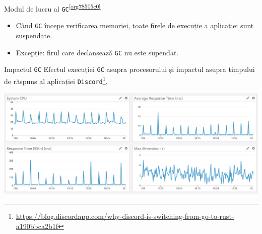 \documentclass[presentation]{beamer}
\begin{document}
\begin{frame}[label={sec:org04d3af9},fragile]{Modul de lucru al \texttt{GC}\textsuperscript{\ref{org78505c0}}}
 \begin{itemize}
\item Când \texttt{GC} începe verificarea memoriei, toate firele de execuție a aplicației sunt suspendate.
\item Excepție: firul care declanșează \texttt{GC} nu este supendat.
\end{itemize}
\end{frame}
\begin{frame}[label={sec:org41baded},fragile]{Impactul \texttt{GC}}
 Efectul execuției \texttt{GC} asupra procesorului și impactul asupra timpului de răspuns al aplicației \texttt{Discord}\footnote{\url{https://blog.discordapp.com/why-discord-is-switching-from-go-to-rust-a190bbca2b1f}}.
\begin{center}
\includegraphics[width=.9\linewidth]{img/gc-impact.png}
\end{center}
\end{frame}
\end{document}
